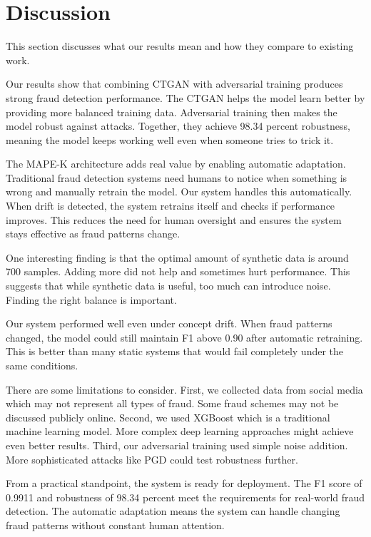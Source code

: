 \section{Discussion}\label{sec:discussion}

This section discusses what our results mean and how they compare to existing work.

Our results show that combining CTGAN with adversarial training produces strong fraud detection performance. The CTGAN helps the model learn better by providing more balanced training data. Adversarial training then makes the model robust against attacks. Together, they achieve 98.34 percent robustness, meaning the model keeps working well even when someone tries to trick it.

The MAPE-K architecture adds real value by enabling automatic adaptation. Traditional fraud detection systems need humans to notice when something is wrong and manually retrain the model. Our system handles this automatically. When drift is detected, the system retrains itself and checks if performance improves. This reduces the need for human oversight and ensures the system stays effective as fraud patterns change.

One interesting finding is that the optimal amount of synthetic data is around 700 samples. Adding more did not help and sometimes hurt performance. This suggests that while synthetic data is useful, too much can introduce noise. Finding the right balance is important.

Our system performed well even under concept drift. When fraud patterns changed, the model could still maintain F1 above 0.90 after automatic retraining. This is better than many static systems that would fail completely under the same conditions.

There are some limitations to consider. First, we collected data from social media which may not represent all types of fraud. Some fraud schemes may not be discussed publicly online. Second, we used XGBoost which is a traditional machine learning model. More complex deep learning approaches might achieve even better results. Third, our adversarial training used simple noise addition. More sophisticated attacks like PGD could test robustness further.

From a practical standpoint, the system is ready for deployment. The F1 score of 0.9911 and robustness of 98.34 percent meet the requirements for real-world fraud detection. The automatic adaptation means the system can handle changing fraud patterns without constant human attention.

